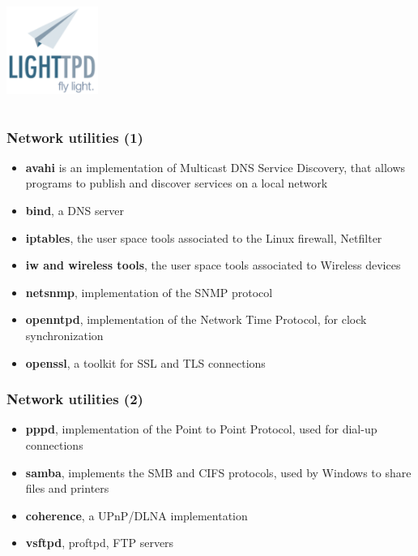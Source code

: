 \begin{frame}
\begin{columns}
    \includegraphics[width=0.9\textwidth]{slides/sysdev-embedded-linux/lighttpd.png}\\
  \end{columns}
\end{frame}

\begin{frame}
  \frametitle{Network utilities (1)}
  \begin{itemize}
  \item {\bf avahi} is an implementation of Multicast DNS Service
    Discovery, that allows programs to publish and discover services
    on a local network
  \item {\bf bind}, a DNS server
  \item {\bf iptables}, the user space tools associated to the Linux firewall, Netfilter
  \item {\bf iw and wireless tools}, the user space tools associated to Wireless devices
  \item {\bf netsnmp}, implementation of the SNMP protocol
  \item {\bf openntpd}, implementation of the Network Time Protocol,
    for clock synchronization
  \item {\bf openssl}, a toolkit for SSL and TLS connections
  \end{itemize}
\end{frame}

\begin{frame}
  \frametitle{Network utilities (2)}
  \begin{itemize}
  \item {\bf pppd}, implementation of the Point to Point Protocol,
    used for dial-up connections
  \item {\bf samba}, implements the SMB and CIFS protocols, used by
    Windows to share files and printers
  \item {\bf coherence}, a UPnP/DLNA implementation
  \item {\bf vsftpd}, proftpd, FTP servers
  \end{itemize}
\end{frame}

